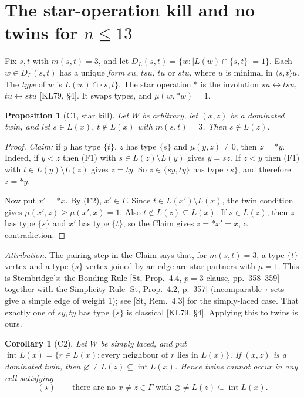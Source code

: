 \documentclass[11pt]{amsart}
\newtheorem{proposition}[theorem]{Proposition}
\newtheorem{corollary}[theorem]{Corollary}
\theoremstyle{definition}
\theoremstyle{remark}
\newcommand{\intr}{\operatorname{int}}
\begin{document}
\section{The star-operation kill and no twins for \texorpdfstring{$n\le13$}{n<=13}}

Fix $s,t$ with $m(s,t)=3$, and let $D_L(s,t)=\{w:|L(w)\cap\{s,t\}|=1\}$. Each $w\in D_L(s,t)$ has a unique \emph{form} $su$, $tsu$, $tu$ or $stu$, where $u$ is minimal in $\langle s,t\rangle u$. The \emph{type} of $w$ is $L(w)\cap\{s,t\}$. The star operation $*$ is the involution $su\leftrightarrow tsu$, $tu\leftrightarrow stu$ [KL79, \S4]. It swaps types, and $\mu(w,{*w})=1$.

\begin{proposition}[C1, star kill]
Let $W$ be arbitrary, let $(x,z)$ be a dominated twin, and let $s\in L(x)$, $t\notin L(x)$ with $m(s,t)=3$. Then $s\notin L(z)$.
\end{proposition}

\begin{proof}
\emph{Claim:} if $y$ has type $\{t\}$, $z$ has type $\{s\}$ and $\mu(y,z)\ne0$, then $z={*y}$. Indeed, if $y<z$ then (F1) with $s\in L(z)\setminus L(y)$ gives $y=sz$. If $z<y$ then (F1) with $t\in L(y)\setminus L(z)$ gives $z=ty$. So $z\in\{sy,ty\}$ has type $\{s\}$, and therefore $z={*y}$.

Now put $x'={*x}$. By (F2), $x'\in\Gamma$. Since $t\in L(x')\setminus L(x)$, the twin condition gives $\mu(x',z)\ge\mu(x',x)=1$. Also $t\notin L(z)\subseteq L(x)$. If $s\in L(z)$, then $z$ has type $\{s\}$ and $x'$ has type $\{t\}$, so the Claim gives $z={*x'}=x$, a contradiction.
\end{proof}

\emph{Attribution.} The pairing step in the Claim says that, for $m(s,t)=3$, a type-$\{t\}$ vertex and a type-$\{s\}$ vertex joined by an edge are star partners with $\mu=1$. This is Stembridge's: the Bonding Rule [St, Prop.~4.4, $p=3$ clause, pp.~358--359] together with the Simplicity Rule [St, Prop.~4.2, p.~357] (incomparable $\tau$-sets give a simple edge of weight $1$); see [St, Rem.~4.3] for the simply-laced case. That exactly one of $sy,ty$ has type $\{s\}$ is classical [KL79, \S4]. Applying this to twins is ours.

\begin{corollary}[C2]
Let $W$ be simply laced, and put $\intr L(x)=\{r\in L(x):\text{every neighbour of $r$ lies in } L(x)\}$. If $(x,z)$ is a dominated twin, then $\varnothing\ne L(z)\subseteq\intr L(x)$. Hence twins cannot occur in any cell satisfying
\[(\star)\qquad\text{there are no } x\ne z\in\Gamma \text{ with } \varnothing\ne L(z)\subseteq\intr L(x).\]
\end{corollary}
\end{document}
